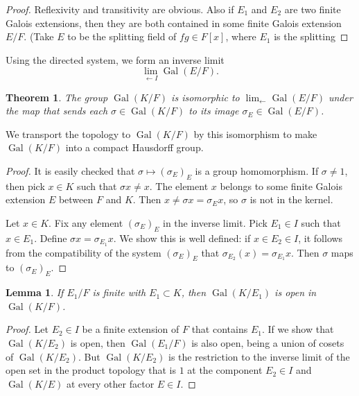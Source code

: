 \documentclass{amsart}
\newtheorem{theorem}[equation]{Theorem}
\newtheorem{lemma}[equation]{Lemma}
\def\op#1{{\operatorname{#1}}}
\def\oG{\op{Gal}}
\begin{document}
\begin{proof}  Reflexivity and transitivity are obvious.  Also if $E_1$ and
$E_2$ are two finite Galois extensions, then they are both contained in
some finite Galois extension $E/F$.  (Take $E$ to be the splitting field
of $fg\in F[x]$, where $E_1$ is the splitting 
\end{proof}

Using the directed system, we form an inverse limit
\[
\lim_{\leftarrow I} \oG(E/F).
\]

\begin{theorem} The group $\oG(K/F)$ is isomorphic to $\lim_{\leftarrow}\oG(E/F)$
under the map that sends each $\sigma\in\oG(K/F)$ to its image $\sigma_E\in \oG(E/F)$.
\end{theorem}

We transport the topology to $\oG(K/F)$ by this isomorphism to make $\oG(K/F)$ into a compact Hausdorff group.

\begin{proof} It is easily checked that $\sigma\mapsto (\sigma_E)_E$ is a group homomorphism.
  If $\sigma\ne1$, then pick $x\in K$ such
that $\sigma x\ne x$.  The element $x$ belongs to some finite Galois extension $E$ between
$F$ and $K$.  Then $x\ne \sigma x = \sigma_E x$, so $\sigma$ is not in the kernel.

  Let $x\in K$.  Fix any element
$(\sigma_E)_E$ in the inverse limit.  Pick $E_1\in I$ such that $x\in E_1$.
Define $\sigma x = \sigma_{E_1} x$.  We show this is well defined: 
if $x\in {E_2}\in I$, it follows from the compatibility
of the system $(\sigma_E)_E$ that $\sigma_{E_2}(x) = \sigma_{E_1}x$.  Then $\sigma$
maps to $(\sigma_E)_E$.
\end{proof}

\begin{lemma}  If $E_1/F$ is finite with $E_1\subset K$,
then $\oG(K/E_1)$ is open in $\oG(K/F)$.
\end{lemma}

\begin{proof}  Let $E_2\in I$ be a finite extension of $F$ that contains $E_1$.  If we show
that $\oG(K/E_2)$ is open, then $\oG(E_1/F)$ is also open, being a union
of cosets of $\oG(K/E_2)$.  But $\oG(K/E_2)$ is the restriction to the
inverse limit of the open set in the product topology that is ${1}$ at the
component $E_2\in I$ and $\oG(K/E)$ at every other factor $E\in I$.
\end{proof}
\end{document}
